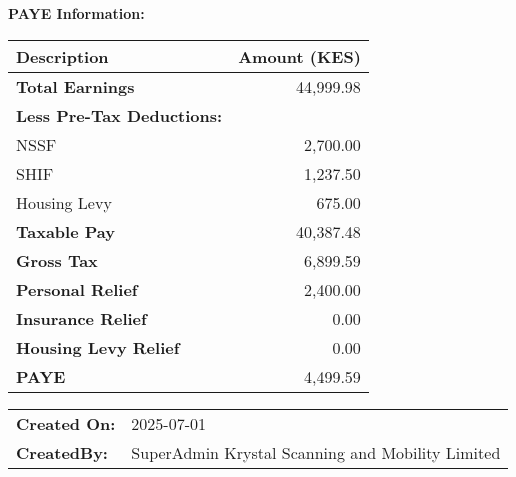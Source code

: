 \documentclass[a4paper]{article}
\begin{document}
\textbf{PAYE Information:} \\
\begin{tabular}{lr}
\toprule
\textbf{Description} & \textbf{Amount (KES)} \\
\midrule
\textbf{Total Earnings} & 44,999.98 \\
\textbf{Less Pre-Tax Deductions:} & \\
NSSF & 2,700.00\\
SHIF & 1,237.50\\
Housing Levy & 675.00 \\
\midrule
\textbf{Taxable Pay} & 40,387.48 \\
\midrule
\textbf{Gross Tax} & 6,899.59 \\
\textbf{Personal Relief} & 2,400.00 \\
\textbf{Insurance Relief} & 0.00 \\
\textbf{Housing Levy Relief} & 0.00 \\
\textbf{PAYE} & 4,499.59 \\
\bottomrule
\end{tabular}

\vspace{0.5cm}

\begin{tabular}{p{2.5in} p{2in}}
\toprule
\textbf{Created On:} & 2025-07-01 \\
\textbf{CreatedBy:} & SuperAdmin Krystal Scanning and Mobility Limited \\
\bottomrule
\end{tabular}
\end{document}

